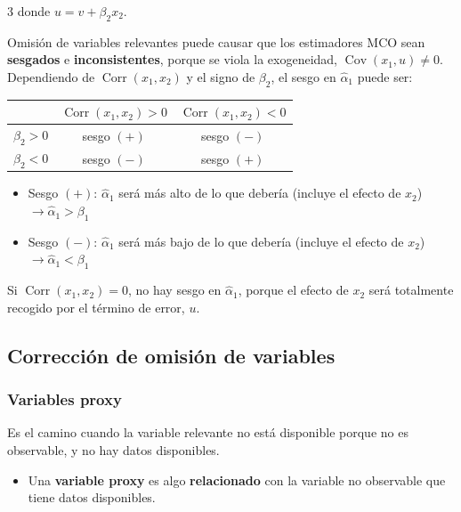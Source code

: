 \documentclass[10pt, a4paper, landscape]{article}
\DeclareMathOperator{\Cov}{Cov}
\DeclareMathOperator{\Corr}{Corr}
\begin{document}
\begin{multicols}{3}
\quad donde \( u = v + \beta_{2} x_{2} \).

Omisión de variables relevantes puede causar que los estimadores MCO sean \textbf{sesgados} e \textbf{inconsistentes}, porque se viola la exogeneidad, \( \Cov(x_{1}, u) \neq 0 \). Dependiendo de \( \Corr(x_{1}, x_{2}) \) y el signo de \( \beta_{2} \), el sesgo en \( \hat{\alpha}_{1} \) puede ser:

\begin{center}
	\begin{tabular}{ c | c c }
		                    & \( \Corr(x_{1}, x_{2}) > 0 \) & \( \Corr(x_{1}, x_{2}) < 0 \) \\ \hline
		\( \beta_{2} > 0 \) & sesgo \( (+) \)               & sesgo \( (-) \)               \\
		\( \beta_{2} < 0 \) & sesgo \( (-) \)               & sesgo \( (+) \)
	\end{tabular}
\end{center}

\begin{itemize}[leftmargin=*]
	\item Sesgo \( (+) \): \( \hat{\alpha}_{1} \) será más alto de lo que debería (incluye el efecto de \( x_{2} \)) \( \rightarrow \hat{\alpha}_{1} > \beta_{1} \)
	\item Sesgo \( (-) \): \( \hat{\alpha}_{1} \) será más bajo de lo que debería (incluye el efecto de \( x_{2} \)) \( \rightarrow \hat{\alpha}_{1} < \beta_{1} \)
\end{itemize}

Si \( \Corr(x_{1}, x_{2}) = 0 \), no hay sesgo en \( \hat{\alpha}_{1} \), porque el efecto de \( x_{2} \) será totalmente recogido por el término de error, \( u \).

\columnbreak

\subsection*{Corrección de omisión de variables}

\subsubsection*{Variables proxy}

Es el camino cuando la variable relevante no está disponible porque no es observable, y no hay datos disponibles.

\begin{itemize}[leftmargin=*]
	\item Una \textbf{variable proxy} es algo \textbf{relacionado} con la variable no observable que tiene datos disponibles.
\end{itemize}


\end{multicols}
\end{document}
